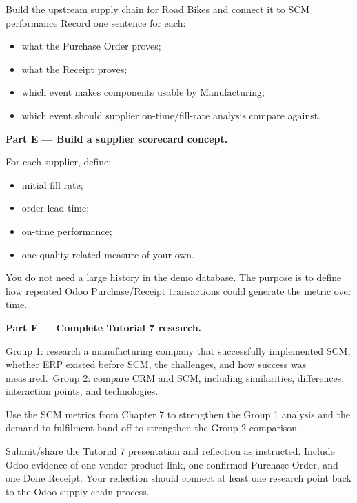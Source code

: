 \begin{labproject}{Build the upstream supply chain for Road Bikes and connect it to SCM performance}
Record one sentence for each:
\begin{itemize}
  \item what the Purchase Order proves;
  \item what the Receipt proves;
  \item which event makes components usable by Manufacturing;
  \item which event should supplier on-time/fill-rate analysis compare against.
\end{itemize}

\medskip\noindent\textbf{Part E --- Build a supplier scorecard concept.}

For each supplier, define:
\begin{itemize}
  \item initial fill rate;
  \item order lead time;
  \item on-time performance;
  \item one quality-related measure of your own.
\end{itemize}

You do not need a large history in the demo database. The purpose is to define how repeated Odoo Purchase/Receipt transactions could generate the metric over time.

\medskip\noindent\textbf{Part F --- Complete Tutorial 7 research.}

Group 1: research a manufacturing company that successfully implemented SCM, whether ERP existed before SCM, the challenges, and how success was measured.\
Group 2: compare CRM and SCM, including similarities, differences, interaction points, and technologies.

Use the SCM metrics from Chapter 7 to strengthen the Group 1 analysis and the demand-to-fulfilment hand-off to strengthen the Group 2 comparison.
\end{labproject}

\begin{labdeliverable}
Submit/share the Tutorial 7 presentation and reflection as instructed. Include Odoo evidence of one vendor-product link, one confirmed Purchase Order, and one Done Receipt. Your reflection should connect at least one research point back to the Odoo supply-chain process.
\end{labdeliverable}
